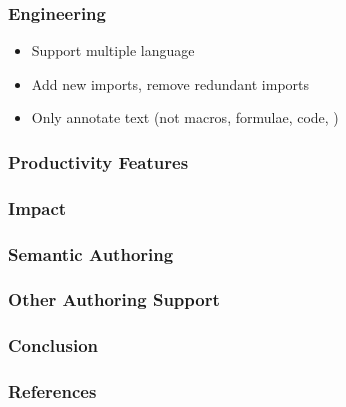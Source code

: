 \documentclass[aspectratio=169]{beamer}
\begin{document}
\begin{frame}
    \frametitle{Engineering}
    \begin{itemize}
        \item Support multiple language
        \item Add new imports, remove redundant imports
        \item Only annotate text (not macros, formulae, code, \textellipsis)
    \end{itemize}
\end{frame}

\begin{frame}
    \frametitle{Productivity Features}
\end{frame}

\begin{frame}
    \frametitle{Impact}
\end{frame}

\begin{frame}
    \frametitle{Semantic Authoring}
\end{frame}

\begin{frame}
    \frametitle{Other Authoring Support}
\end{frame}

\begin{frame}
    \frametitle{Conclusion}
\end{frame}

\begin{frame}[allowframebreaks,t]
    \frametitle{References}
    \printbibliography
\end{frame}
\end{document}

